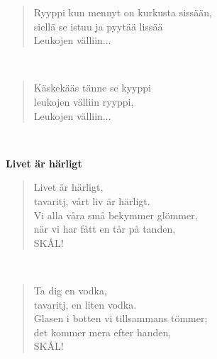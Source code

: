 \noindent\begin{minipage}{\linewidth}
\begin{verse}
	Ryyppi kun mennyt on kurkusta sissään,\\
	siellä se istuu ja pyytää lissää\\
	Leukojen välliin...\\
\end{verse}
\end{minipage}\\[10pt]
\noindent\begin{minipage}{\linewidth}
\begin{verse}
	Käskekääs tänne se kyyppi\\
	leukojen välliin ryyppi,\\
	Leukojen välliin...\\
\end{verse}
\end{minipage}\\[10pt]
%
%
\noindent\begin{minipage}{\linewidth}
\vspace{5pt}
\parbox[t]{0.85\linewidth}{\raggedright {\large\bf Livet är härligt}\\[6pt]}
\begin{verse}
	Livet är härligt,\\
	tavaritj, vårt liv är härligt.\\
	Vi alla våra små bekymmer glömmer,\\
	när vi har fått en tår på tanden,\\
	SKÅL!\\
\end{verse}
\end{minipage}\\[10pt]
\noindent\begin{minipage}{\linewidth}
\begin{verse}
	Ta dig en vodka,\\
	tavaritj, en liten vodka.\\
	Glasen i botten vi tillsammans tömmer;\\
	det kommer mera efter handen,\\
	SKÅL!\\
\end{verse}
\end{minipage}\\[10pt]
